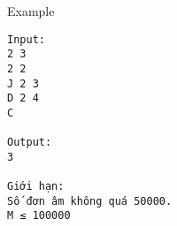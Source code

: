 Example
\begin{verbatim}
Input:
2 3
2 2
J 2 3
D 2 4
C

Output:
3

Giới hạn:
Số đơn âm không quá 50000.
M ≤ 100000
\end{verbatim}
